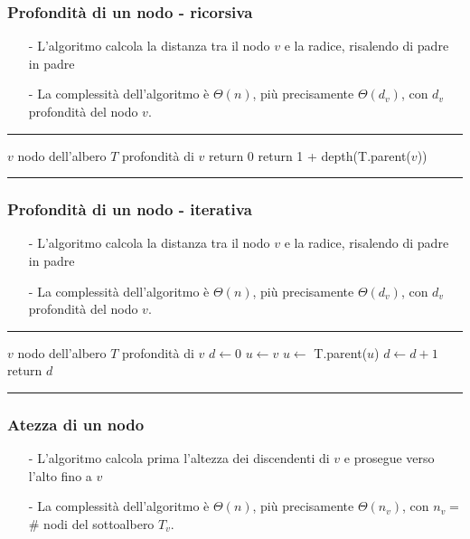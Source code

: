 \documentclass[a4paper]{article}
\makeatletter
\newenvironment{algo}[4]{
	\noindent\rule{\textwidth}{0.4pt}
	\begin{algorithmic}[1]
		\addtocounter{ALG@line}{-1}
		\Procedure{#1}{#2}
		\Require #3
		\Ensure #4
		\Statex }{
		\EndProcedure
	\end{algorithmic}
	\rule{\textwidth}{0.4pt}}
\makeatother
\begin{document}
\subsubsection*{Profondità di un nodo - ricorsiva}
\begin{itemize}[topsep=3pt, itemsep=0pt]
	\item[-] L'algoritmo calcola la distanza tra il nodo \(v\) e la radice, risalendo di padre in padre
	\item[-] La complessità dell'algoritmo è \(\Theta(n)\), più precisamente \(\Theta(d_v)\), con \(d_v\) profondità del nodo \(v\).
\end{itemize}

\begin{algo}{depth\_ric}{$v$}{$v$ nodo dell'albero $T$}{profondità di $v$}
		\State return 0
	\Else
		\State return 1 + depth(T.parent($v$))
	\EndIf
\end{algo}

\subsubsection*{Profondità di un nodo - iterativa}
\begin{itemize}[topsep=3pt, itemsep=0pt]
	\item[-] L'algoritmo calcola la distanza tra il nodo \(v\) e la radice, risalendo di padre in padre
	\item[-] La complessità dell'algoritmo è \(\Theta(n)\), più precisamente \(\Theta(d_v)\), con \(d_v\) profondità del nodo \(v\).
\end{itemize}

\begin{algo}{depth\_iter}{$v$}{$v$ nodo dell'albero $T$}{profondità di $v$}
	\State $d \gets 0$
	\State $u \gets v$
		\State $u \gets $ T.parent($u$)
		\State $d \gets d+1$
	\EndWhile
	\State return $d$
\end{algo}

\subsubsection*{Atezza di un nodo}
\begin{itemize}[topsep=3pt, itemsep=0pt]
	\item[-] L'algoritmo calcola prima l'altezza dei discendenti di \(v\) e prosegue verso l'alto fino a \(v\)
	\item[-] La complessità dell'algoritmo è \(\Theta(n)\), più precisamente \(\Theta(n_v)\), con \(n_v=\) \# nodi del sottoalbero \(T_v\).
\end{itemize}
\end{document}
